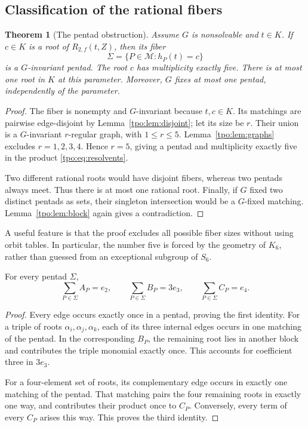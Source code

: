 \documentclass[11pt,letterpaper]{article}
\numberwithin{equation}{section}
\newtheorem{theorem}{Theorem}[section]
\theoremstyle{definition}
\theoremstyle{remark}
\newcommand{\Rtwo}{R_{2,f}}
\newcommand{\tpoM}{\mathcal M}
\begin{document}
\subsection{Classification of the rational fibers}
\begin{theorem}[The pentad obstruction]
\label{tpo:thm:fiber}
Assume $G$ is nonsolvable and $t\in K$. If $c\in K$ is a root of
$\Rtwo(t,Z)$, then its fiber
\[
 \Sigma=\{P\in\tpoM:h_P(t)=c\}
\]
is a $G$-invariant pentad. The root $c$ has multiplicity exactly five.
There is at most one root in $K$ at this parameter. Moreover, $G$ fixes at
most one pentad, independently of the parameter.
\end{theorem}
\begin{proof}
The fiber is nonempty and $G$-invariant because $t,c\in K$. Its matchings
are pairwise edge-disjoint by Lemma~\ref{tpo:lem:disjoint}; let its size be $r$.
Their union is a $G$-invariant $r$-regular graph, with $1\le r\le5$.
Lemma~\ref{tpo:lem:graphs} excludes $r=1,2,3,4$. Hence $r=5$, giving a pentad
and multiplicity exactly five in the product \eqref{tpo:eq:resolvents}.

Two different rational roots would have disjoint fibers, whereas two
pentads always meet. Thus there is at most one rational root. Finally, if
$G$ fixed two distinct pentads as sets, their singleton intersection would
be a $G$-fixed matching. Lemma~\ref{tpo:lem:block} again gives a contradiction.
\end{proof}

A useful feature is that the proof excludes all possible fiber sizes without
using orbit tables. In particular, the number five is forced by the geometry
of $K_6$, rather than guessed from an exceptional subgroup of $S_6$.

\begin{lemma}
\label{tpo:lem:averages}
For every pentad $\Sigma$,
\begin{equation}
 \sum_{P\in\Sigma}A_P=e_2,\qquad
 \sum_{P\in\Sigma}B_P=3e_3,\qquad
 \sum_{P\in\Sigma}C_P=e_4.
 \label{tpo:eq:averages}
\end{equation}
\end{lemma}
\begin{proof}
Every edge occurs exactly once in a pentad, proving the first identity.
For a triple of roots $\alpha_i,\alpha_j,\alpha_k$, each of its three internal
edges occurs in one matching of the pentad. In the corresponding $B_P$, the
remaining root lies in another block and contributes the triple monomial
exactly once. This accounts for coefficient three in $3e_3$.

For a four-element set of roots, its complementary edge occurs in exactly
one matching of the pentad. That matching pairs the four remaining roots
in exactly one way, and contributes their product once to $C_P$. Conversely,
every term of every $C_P$ arises this way. This proves the third identity.
\end{proof}
\end{document}
